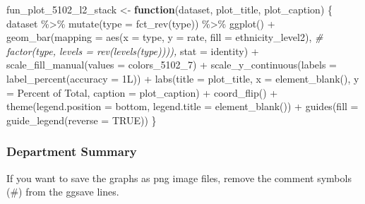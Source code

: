 \documentclass[
]{article}
\newenvironment{Shaded}{\begin{snugshade}}{\end{snugshade}}
\newcommand{\AttributeTok}[1]{\textcolor[rgb]{0.77,0.63,0.00}{#1}}
\newcommand{\CommentTok}[1]{\textcolor[rgb]{0.56,0.35,0.01}{\textit{#1}}}
\newcommand{\ConstantTok}[1]{\textcolor[rgb]{0.00,0.00,0.00}{#1}}
\newcommand{\ControlFlowTok}[1]{\textcolor[rgb]{0.13,0.29,0.53}{\textbf{#1}}}
\newcommand{\FunctionTok}[1]{\textcolor[rgb]{0.00,0.00,0.00}{#1}}
\newcommand{\NormalTok}[1]{#1}
\newcommand{\OtherTok}[1]{\textcolor[rgb]{0.56,0.35,0.01}{#1}}
\newcommand{\SpecialCharTok}[1]{\textcolor[rgb]{0.00,0.00,0.00}{#1}}
\newcommand{\StringTok}[1]{\textcolor[rgb]{0.31,0.60,0.02}{#1}}
\begin{document}
\begin{Shaded}
\begin{Highlighting}[]
\NormalTok{fun\_plot\_5102\_l2\_stack }\OtherTok{\textless{}{-}} \ControlFlowTok{function}\NormalTok{(dataset, plot\_title, plot\_caption) \{}
\NormalTok{    dataset }\SpecialCharTok{\%\textgreater{}\%} 
        \FunctionTok{mutate}\NormalTok{(}\AttributeTok{type =} \FunctionTok{fct\_rev}\NormalTok{(type)) }\SpecialCharTok{\%\textgreater{}\%}
        \FunctionTok{ggplot}\NormalTok{() }\SpecialCharTok{+}
        \FunctionTok{geom\_bar}\NormalTok{(}\AttributeTok{mapping =} \FunctionTok{aes}\NormalTok{(}\AttributeTok{x =}\NormalTok{ type, }
                               \AttributeTok{y =}\NormalTok{ rate, }
                               \AttributeTok{fill =}\NormalTok{ ethnicity\_level2), }\CommentTok{\# factor(type, levels = rev(levels(type)))), }
                 \AttributeTok{stat =} \StringTok{\textquotesingle{}identity\textquotesingle{}}\NormalTok{) }\SpecialCharTok{+}
        \FunctionTok{scale\_fill\_manual}\NormalTok{(}\AttributeTok{values =}\NormalTok{ colors\_5102\_7) }\SpecialCharTok{+}
        \FunctionTok{scale\_y\_continuous}\NormalTok{(}\AttributeTok{labels =} \FunctionTok{label\_percent}\NormalTok{(}\AttributeTok{accuracy =}\NormalTok{ 1L)) }\SpecialCharTok{+}
        \FunctionTok{labs}\NormalTok{(}\AttributeTok{title =}\NormalTok{ plot\_title,}
             \AttributeTok{x =} \FunctionTok{element\_blank}\NormalTok{(),}
             \AttributeTok{y =} \StringTok{\textquotesingle{}Percent of Total\textquotesingle{}}\NormalTok{, }
             \AttributeTok{caption =}\NormalTok{ plot\_caption) }\SpecialCharTok{+}
        \FunctionTok{coord\_flip}\NormalTok{() }\SpecialCharTok{+} 
        \FunctionTok{theme}\NormalTok{(}\AttributeTok{legend.position =} \StringTok{\textquotesingle{}bottom\textquotesingle{}}\NormalTok{, }
              \AttributeTok{legend.title =} \FunctionTok{element\_blank}\NormalTok{()) }\SpecialCharTok{+}
        \FunctionTok{guides}\NormalTok{(}\AttributeTok{fill =} \FunctionTok{guide\_legend}\NormalTok{(}\AttributeTok{reverse =} \ConstantTok{TRUE}\NormalTok{))}
\NormalTok{\}}
\end{Highlighting}
\end{Shaded}

\hypertarget{department-summary}{%
\subsubsection{Department Summary}\label{department-summary}}

If you want to save the graphs as png image files, remove the comment
symbols (\#) from the ggsave lines.
\end{document}
